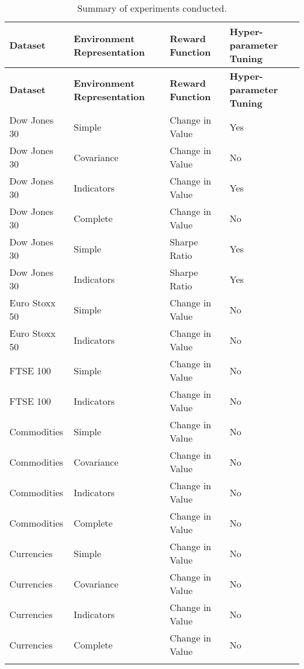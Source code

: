 \begin{longtable}{|p{3cm}|p{3cm}|p{3.5cm}|p{3.5cm}|}
    \hline
    \textbf{Dataset} & \textbf{Environment Representation} & \textbf{Reward Function} & \textbf{Hyper-parameter Tuning} \\ \midrule
    \endfirsthead

    \hline
    \textbf{Dataset} & \textbf{Environment Representation} & \textbf{Reward Function} & \textbf{Hyper-parameter Tuning} \\ \midrule
    \endhead

    \endfoot
    \hline
    Dow Jones 30    & Simple         & Change in Value & Yes \\ \hline
    Dow Jones 30    & Covariance     & Change in Value & No \\ \hline
    Dow Jones 30    & Indicators     & Change in Value & Yes \\ \hline
    Dow Jones 30    & Complete       & Change in Value & No \\ \hline
    Dow Jones 30    & Simple         & Sharpe Ratio    & Yes \\ \hline
    Dow Jones 30    & Indicators     & Sharpe Ratio    & Yes \\ \hline
    Euro Stoxx 50   & Simple         & Change in Value & No  \\ \hline
    Euro Stoxx 50   & Indicators     & Change in Value & No  \\ \hline
    FTSE 100        & Simple         & Change in Value & No  \\ \hline
    FTSE 100        & Indicators     & Change in Value & No  \\ \hline
    Commodities     & Simple         & Change in Value & No  \\ \hline
    Commodities     & Covariance     & Change in Value & No  \\ \hline
    Commodities     & Indicators     & Change in Value & No  \\ \hline
    Commodities     & Complete       & Change in Value & No  \\ \hline
    Currencies      & Simple         & Change in Value & No  \\ \hline
    Currencies      & Covariance     & Change in Value & No  \\ \hline
    Currencies      & Indicators     & Change in Value & No  \\ \hline
    Currencies      & Complete       & Change in Value & No  \\ \hline
\caption{Summary of experiments conducted.}
\label{tab:experiments-summary}
\end{longtable}
